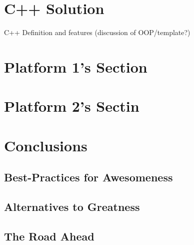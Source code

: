 \documentclass[11pt,letterpaper]{article}
\begin{document}
\section{C++ Solution }
C++ Definition and features (discussion of OOP/template?)

\blindtext
{}
\Blindtext[2]

\section{Platform 1's Section}
\label{sec:platform1}
\Blindtext[4]

\section{Platform 2's Sectin}
\label{sec:platform2}
\Blindtext[3]


\section{Conclusions}
\blindtext

\subsection{Best-Practices for Awesomeness}
\blindtext

\subsection{Alternatives to Greatness}
\blindtext

\subsection{The Road Ahead}
\blindtext





%

\printindex
\end{document}
